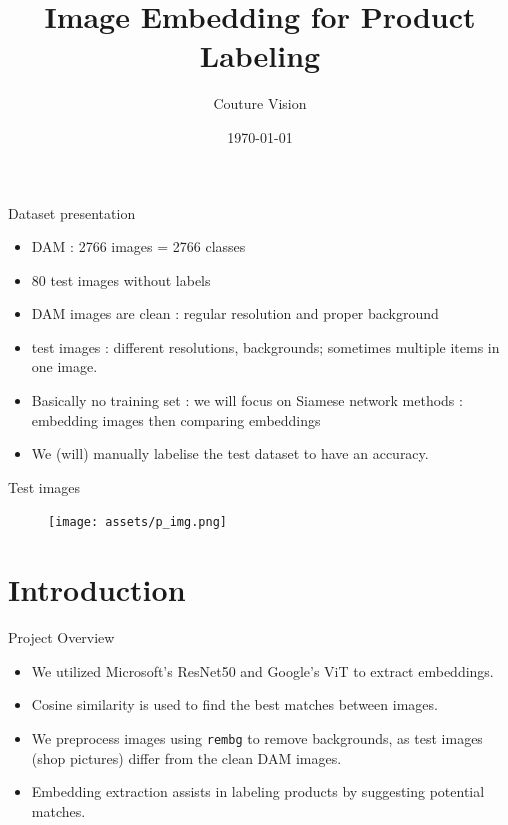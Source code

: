 \documentclass{beamer}
\title{Image Embedding for Product Labeling}
\author{Couture Vision}
\date{\today}
\begin{document}
\frame{\titlepage}

\begin{frame}{Dataset presentation}
    \begin{itemize}
        \item DAM : 2766 images = 2766 classes
        \item 80 test images without labels
        \item DAM images are clean : regular resolution and proper background
        \item test images : different resolutions, backgrounds; sometimes multiple items in one image.
        \item Basically no training set : we will focus on Siamese network methods : embedding images then comparing embeddings
        \item We (will) manually labelise the test dataset to have an accuracy.
    \end{itemize}
    \end{frame}
    
    \begin{frame}{Test images}
        \begin{figure}
            \texttt{[image: assets/p\_img.png]}
        \end{figure}
    \end{frame}

\section{Introduction}
\begin{frame}{Project Overview}
\begin{itemize}
    \item We utilized Microsoft's ResNet50 and Google's ViT to extract embeddings.
    \item Cosine similarity is used to find the best matches between images.
    \item We preprocess images using \texttt{rembg} to remove backgrounds, as test images (shop pictures) differ from the clean DAM images.
    \item Embedding extraction assists in labeling products by suggesting potential matches.
\end{itemize}
\end{frame}
\end{document}
